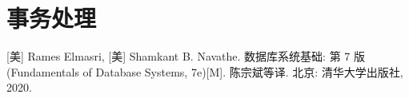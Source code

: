 \documentclass[10pt,UTF8]{book} %
\begin{document}
\chapter{事务处理}





\begin{thebibliography}{1}
    [美] Rames Elmasri, [美] Shamkant B. Navathe. 数据库系统基础: 第 7 版
    (Fundamentals of Database Systems, 7e)[M].
    陈宗斌等译. 北京: 清华大学出版社, 2020.
\end{thebibliography}


\end{document}

